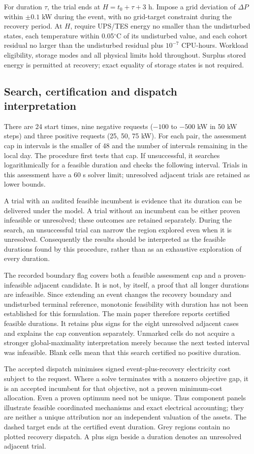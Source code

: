 For duration $\tau$, the trial ends at $H=t_0+\tau+3$ h. Impose a grid deviation of $\Delta P$ within $\pm0.1$ kW during the event, with no grid-target constraint during the recovery period. At $H$, require UPS/TES energy no smaller than the undisturbed states, each temperature within 0.05$^{\circ}$C of its undisturbed value, and each cohort residual no larger than the undisturbed residual plus $10^{-7}$ CPU-hours. Workload eligibility, storage modes and all physical limits hold throughout. Surplus stored energy is permitted at recovery; exact equality of storage states is not required.

\subsection{Search, certification and dispatch interpretation}
There are 24 start times, nine negative requests ($-100$ to $-500$ kW in 50 kW steps) and three positive requests (25, 50, 75 kW). For each pair, the assessment cap in intervals is the smaller of 48 and the number of intervals remaining in the local day. The procedure first tests that cap. If unsuccessful, it searches logarithmically for a feasible duration and checks the following interval. Trials in this assessment have a 60 s solver limit; unresolved adjacent trials are retained as lower bounds.

A trial with an audited feasible incumbent is evidence that its duration can be delivered under the model. A trial without an incumbent can be either proven infeasible or unresolved; these outcomes are retained separately. During the search, an unsuccessful trial can narrow the region explored even when it is unresolved. Consequently the results should be interpreted as the feasible durations found by this procedure, rather than as an exhaustive exploration of every duration.

The recorded boundary flag covers both a feasible assessment cap and a proven-infeasible adjacent candidate. It is not, by itself, a proof that all longer durations are infeasible. Since extending an event changes the recovery boundary and undisturbed terminal reference, monotonic feasibility with duration has not been established for this formulation. The main paper therefore reports certified feasible durations. It retains plus signs for the eight unresolved adjacent cases and explains the cap convention separately. Unmarked cells do not acquire a stronger global-maximality interpretation merely because the next tested interval was infeasible. Blank cells mean that this search certified no positive duration.

The accepted dispatch minimises signed event-plus-recovery electricity cost subject to the request. Where a solve terminates with a nonzero objective gap, it is an accepted incumbent for that objective, not a proven minimum-cost allocation. Even a proven optimum need not be unique. Thus component panels illustrate feasible coordinated mechanisms and exact electrical accounting; they are neither a unique attribution nor an independent valuation of the assets. The dashed target ends at the certified event duration. Grey regions contain no plotted recovery dispatch. A plus sign beside a duration denotes an unresolved adjacent trial.
